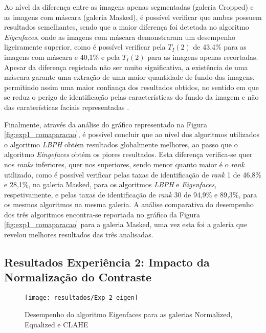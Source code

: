 Ao nível da diferença entre as imagens apenas segmentadas (galeria Cropped) e as imagens com máscara (galeria Masked), é possível verificar que ambas possuem resultados semelhantes, sendo que a maior diferença foi detetada no algoritmo \textit{Eigenfaces}, onde as imagens com máscara demonstraram um desempenho ligeiramente superior, como é possível verificar pela $T_{I}(2)$ de 43,4\% para as imagens com máscara e 40,1\% e pela $T_{I}(2)$ para as imagens apenas recortadas. Apesar da diferença registada não ser muito significativa, a existência de uma máscara garante uma extração de uma maior quantidade de fundo das imagens, permitindo assim uma maior confiança dos resultados obtidos, no sentido em que se reduz o perigo de identificação pelas características do fundo da imagem e não das caraterísticas faciais representadas \cite{Kumar2009}. 

Finalmente, através da análise do gráfico representado na Figura \ref{fig:exp1_comaparacao}, é possível concluir que ao nível dos algoritmos utilizados o algoritmo \textit{LBPH} obtém resultados globalmente melhores, ao passo que o algoritmo \textit{Eingefaces} obtém os piores resultados. Esta diferença verifica-se quer nos \textit{ranks} inferiores, quer nos superiores, sendo menor quanto maior é o \textit{rank} utilizado, como é possível verificar pelas taxas de identificação de \textit{rank} 1 de 46,8\% e 28,1\%, na galeria Masked, para os algoritmos \textit{LBPH} e \textit{Eigenfaces}, respetivamente, e pelas taxas de identificação de \textit{rank} 30 de 94,9\% e 89,3\%, para os mesmos algoritmos na mesma galeria. A análise comparativa do desempenho dos três algoritmos encontra-se reportada no gráfico da Figura \ref{fig:exp1_comaparacao} para a galeria Masked, uma vez esta foi a galeria que revelou melhores resultados das três analisadas.

\subsection{Resultados Experiência 2: Impacto da Normalização do Contraste} \label{sec:avaliacao2-exp2}

        \begin{figure}[ht]
                \centering
                \texttt{[image: resultados/Exp\_2\_eigen]}
                \caption{Desempenho do algoritmo Eigenfaces para as galerias Normalized, Equalized e CLAHE}
                \label{fig:masked_normalized_equalized_clahe_eigen}
        \end{figure}%

